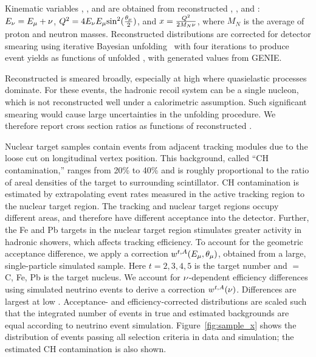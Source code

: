 Kinematic variables \Enu, \Xbj, and \Qsq are obtained 
from reconstructed \Emu, \thetamu, and \recoilE:
$E_{\nu} = E_{\mu} + \nu$, $Q^{2} = 4 E_{\nu} E_{\mu} {\rm{sin}}^2(\frac{\theta_{\mu}}{2})$, 
and $x = \frac{Q^{2}}{2 M_{N}\nu}$, where $M_{N}$ is the average 
of proton and neutron masses.
Reconstructed \Enu distributions are corrected for detector smearing 
using iterative Bayesian
unfolding~\cite{D'Agostini:1994zf} with four iterations to produce 
event yields as functions of unfolded \Enu, with generated \Enu values from GENIE.

Reconstructed \Xbj is smeared broadly, especially at high \Xbj where quasielastic processes dominate.
For these events, the hadronic recoil system can be a single nucleon, which is not reconstructed well under a calorimetric assumption.
Such significant smearing would cause large uncertainties in the unfolding procedure.
We therefore report cross section ratios as functions of reconstructed \Xbj{}.

Nuclear target samples contain events from adjacent tracking modules due to the loose cut on longitudinal vertex position.
This background, called ``CH contamination,''
ranges from 20\% to 40\% and is roughly proportional to 
the ratio of areal densities of the target to surrounding scintillator.
CH contamination
is estimated by extrapolating event rates measured
in the active tracking region to the nuclear target region.
The tracking and nuclear target regions occupy different areas, and therefore have different acceptance into the \minos detector.
Further, the Fe and Pb targets in the nuclear target region stimulates greater activity in hadronic showers, 
which affects tracking efficiency.
To account for the geometric acceptance difference, we apply a 
correction $w^{t,A}(E_{\mu},\theta_{\mu})$,
obtained from a large, single-particle simulated \mum sample.
Here $t=2,3,4,5$ is the target number and \A$=\:$C, Fe, Pb is the target nucleus.
We account for $\nu$-dependent efficiency differences using
simulated neutrino events to derive a correction $w^{t,A}(\nu)$.
Differences are largest at low \recoilE.
Acceptance- and efficiency-corrected distributions are scaled such that the integrated number of
events in true and estimated backgrounds are equal according to neutrino event simulation.
Figure~\ref{fig:sample_x} shows the \Xbj distribution of events passing all 
selection criteria in data and simulation; the estimated CH contamination is also shown.

